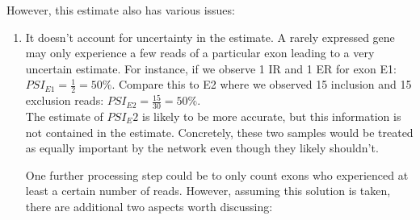 However, this estimate also has various issues:
\begin{enumerate}
	\item It doesn't account for uncertainty in the estimate. A rarely expressed gene may only experience a few reads of a particular exon leading to a very uncertain estimate. For instance, if we observe 1 IR and 1 ER for exon E1: $PSI_{E1} = \frac{1}{2} = 50\%$. Compare this to E2 where we observed 15 inclusion and 15 exclusion reads: $PSI_{E2} = \frac{15}{30} = 50\%$.\\
	The estimate of $PSI_E2$ is likely to be more accurate, but this information is not contained in the estimate. Concretely, these two samples would be treated as equally important by the network even though they likely shouldn't.
	
	One further processing step could be to only count exons who experienced at least a certain number of reads. However, assuming this solution is taken, there are additional two aspects worth discussing:


	
	

\end{enumerate}
